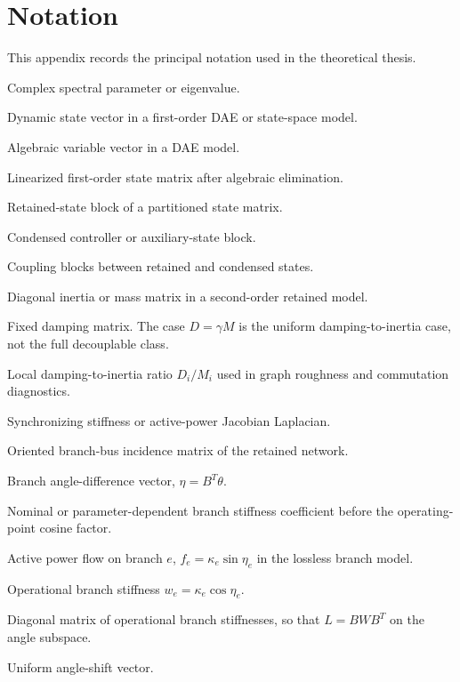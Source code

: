 \chapter{Notation}

This appendix records the principal notation used in the theoretical thesis.

\begin{description}[leftmargin=3.2cm,style=nextline]
\item[\(s\)] Complex spectral parameter or eigenvalue.
\item[\(x\)] Dynamic state vector in a first-order DAE or state-space model.
\item[\(y\)] Algebraic variable vector in a DAE model.
\item[\(A\)] Linearized first-order state matrix after algebraic elimination.
\item[\(A_{ee}\)] Retained-state block of a partitioned state matrix.
\item[\(A_{cc}\)] Condensed controller or auxiliary-state block.
\item[\(A_{ec},A_{ce}\)] Coupling blocks between retained and condensed states.
\item[\(M\)] Diagonal inertia or mass matrix in a second-order retained model.
\item[\(D\)] Fixed damping matrix. The case \(D=\gamma M\) is the uniform
damping-to-inertia case, not the full decouplable class.
\item[\(\gamma_i\)] Local damping-to-inertia ratio \(D_i/M_i\) used in graph
roughness and commutation diagnostics.
\item[\(L\)] Synchronizing stiffness or active-power Jacobian Laplacian.
\item[\(B\)] Oriented branch-bus incidence matrix of the retained network.
\item[\(\eta\)] Branch angle-difference vector, \(\eta=B^T\theta\).
\item[\(\kappa_e\)] Nominal or parameter-dependent branch stiffness
coefficient before the operating-point cosine factor.
\item[\(f_e\)] Active power flow on branch \(e\), \(f_e=\kappa_e\sin\eta_e\)
in the lossless branch model.
\item[\(w_e\)] Operational branch stiffness \(w_e=\kappa_e\cos\eta_e\).
\item[\(W\)] Diagonal matrix of operational branch stiffnesses, so that
\(L=BWB^T\) on the angle subspace.
\item[\(\ones\)] Uniform angle-shift vector.

\end{description}
